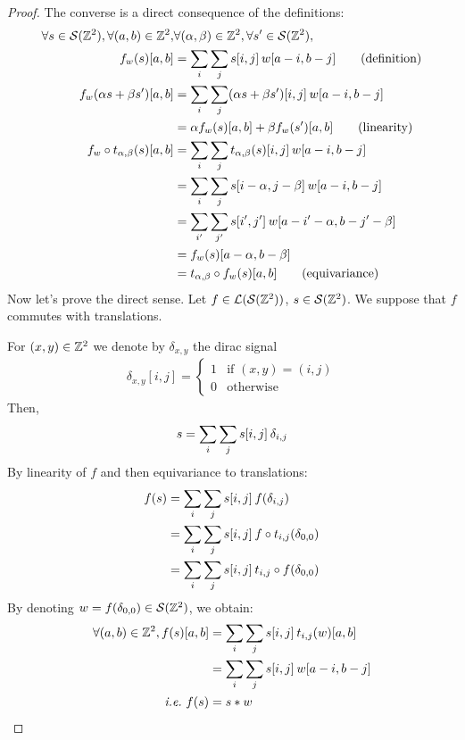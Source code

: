 \begin{proof}
The converse is a direct consequence of the definitions:
\begin{align}
\forall s \in \cs(\bbz^2), \forall (a,b) \in \bbz^2, & \forall (\alpha, \beta) \in \bbz^2, \forall s' \in \cs(\bbz^2),\nonumber\\
 f_w(s)[a,b] & = \displaystyle \sum_i \sum_j s[i,j] \h{2} w[a-i, b-j] \tag{definition}\\
 f_w(\alpha s + \beta s')[a,b] & = \displaystyle \sum_i \sum_j (\alpha s + \beta s')[i,j] \h{2} w[a-i, b-j]\nonumber\\
 & = \alpha f_w(s)[a,b] + \beta f_w(s')[a,b] \tag{linearity}\\
f_w \circ t_{\alpha,\beta} (s)[a,b] & = \displaystyle \sum_i \sum_j t_{\alpha,\beta}(s)[i,j] \h{2} w[a-i, b-j]\nonumber\\
 & = \displaystyle \sum_i \sum_j s[i - \alpha,j - \beta] \h{2} w[a-i, b-j]\nonumber\\
 & = \displaystyle \sum_{i'} \sum_{j'} s[i',j'] \h{2} w[a - i' - \alpha, b - j'- \beta]\label{eq:bij}\\
 & = f_w (s)[a - \alpha,b - \beta]\nonumber\\
 & = t_{\alpha,\beta} \circ f_w (s)[a,b] \tag{equivariance}
\end{align}
Now let's prove the direct sense.
Let $f \in \cl(\cs(\bbz^2))$, $s \in \cs(\bbz^2)$. We suppose that $f$ commutes with translations.

For $(x,y) \in \bbz^2$ we denote by $\delta_{x,y}$ the dirac signal
\begin{gather*}
\delta_{x,y}[i,j] = \begin{cases} 1 & \text{if } (x,y) = (i,j)\\ 0 & \text{otherwise} \end{cases}
\end{gather*}
Then,
\begin{gather*}
s = \displaystyle \sum_i \sum_j s[i,j] \h{2} \delta_{i,j}
\end{gather*}
By linearity of $f$ and then equivariance to translations:
\begin{align*}
f(s) & = \displaystyle \sum_i \sum_j s[i,j] \h{2} f(\delta_{i,j})\\
 & = \displaystyle \sum_i \sum_j s[i,j] \h{2} f \circ t_{i,j} (\delta_{0,0})\\
 & = \displaystyle \sum_i \sum_j s[i,j] \h{2} t_{i,j} \circ f (\delta_{0,0})
\end{align*}
By denoting $w = f (\delta_{0,0}) \in \cs(\bbz^2)$, we obtain:
\begin{align}
\forall (a,b) \in \bbz^2, f(s)[a,b] & = \displaystyle \sum_i \sum_j s[i,j] \h{2} t_{i,j}(w)[a,b] \label{eq:conv}\\
 & = \displaystyle \sum_i \sum_j s[i,j] \h{2} w[a-i, b-j] \nonumber\\
\text{\ie } f(s) & = s \ast w \nonumber
\end{align}
\end{proof}

